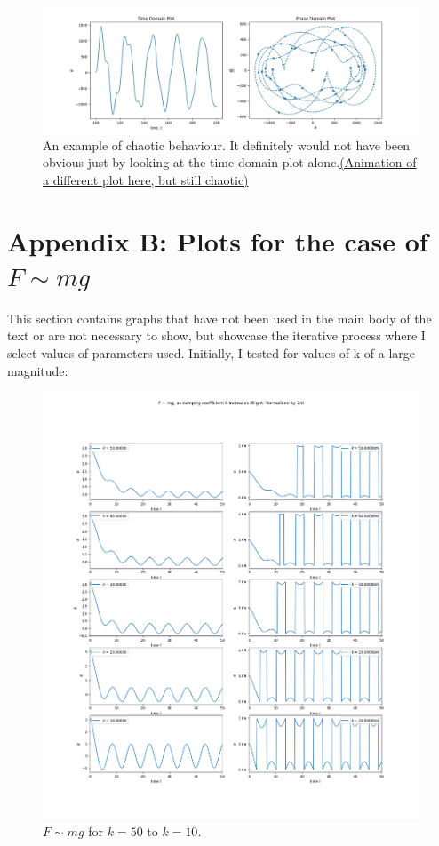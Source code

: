 \documentclass[10pt, twocolumn]{article}
\begin{document}
\begin{figure}[H]
    \centering
    \includegraphics[width = \columnwidth]{Projects/ForcedSimplePendulum/Plots/demo_chaos.jpg}
    \caption{An example of chaotic behaviour. It definitely would not have been obvious just by looking at the time-domain plot alone.\href{https://github.com/linsuong/PHYS-6017-Labs/blob/main/Projects/ForcedSimplePendulum/Plots/demo\%20chaos.gif}{(Animation of a different plot here, but still chaotic)}}
    \label{fig:enter-label}
\end{figure}

\section{Appendix B: Plots for the case of $F \sim{mg}$}{\label{plotsFmg}}
This section contains graphs that have not been used in the main body of the text or are not necessary to show, but showcase the iterative process where I select values of parameters used. Initially, I tested for values of k of a large magnitude:
\begin{figure}
    \centering
    \includegraphics[width = \columnwidth]{Projects/ForcedSimplePendulum/Plots/F~mg as damping coefficient k increases from 50 to 10.png}
    \caption{$F \sim{mg}$ for $k = 50$ to $k = 10$.}
    \label{k 50 to 10}
\end{figure}
\end{document}

